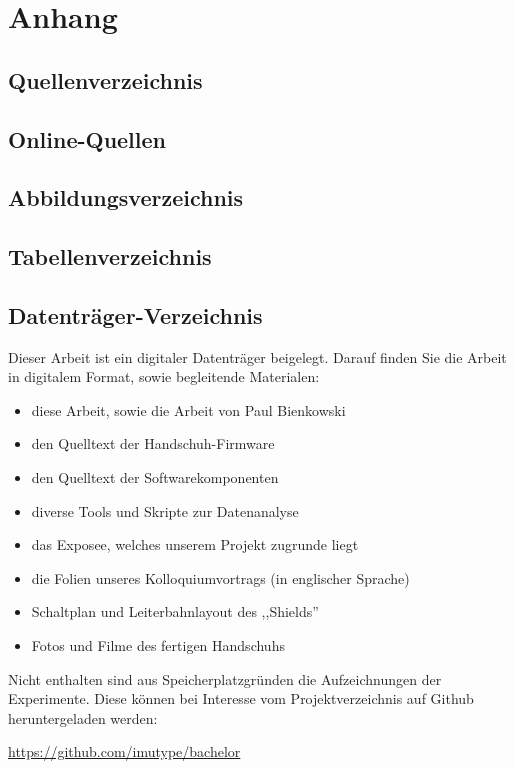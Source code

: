 \chapter{Anhang}

\section{Quellenverzeichnis}
\printbibliography[nottype=online,heading=none,title=none]

\section{Online-Quellen}
\newrefcontext[sorting=none]
\printbibliography[type=online,heading=none,title=none,env=bibliographyNUM,resetnumbers]

\section{Abbildungsverzeichnis}
\makeatletter
{}
\makeatother

\section{Tabellenverzeichnis}
\makeatletter
{}
\makeatother

\section{Datenträger-Verzeichnis}

Dieser Arbeit ist ein digitaler Datenträger beigelegt. Darauf finden Sie die
Arbeit in digitalem Format, sowie begleitende Materialen:

\begin{itemize}[noitemsep]
    \item diese Arbeit, sowie die Arbeit von Paul Bienkowski
    \item den Quelltext der Handschuh-Firmware
    \item den Quelltext der Softwarekomponenten
    \item diverse Tools und Skripte zur Datenanalyse
    \item das Exposee, welches unserem Projekt zugrunde liegt
    \item die Folien unseres Kolloquiumvortrags (in englischer Sprache)
    \item Schaltplan und Leiterbahnlayout des ,,Shields''
    \item Fotos und Filme des fertigen Handschuhs
\end{itemize}

Nicht enthalten sind aus Speicherplatzgründen die Aufzeichnungen der
Experimente. Diese können bei Interesse vom Projektverzeichnis auf Github
heruntergeladen werden:

\begin{center}
    \url{https://github.com/imutype/bachelor}
\end{center}

